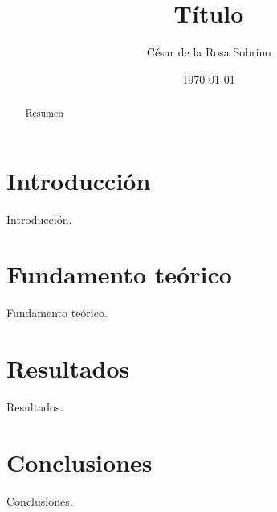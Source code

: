 \documentclass[twocolumn, aps, prd, 10pt, nofootinbib]{revtex4-2}
\date{\today}
\makeatletter
\renewcommand{\date}[1]{\gdef\@date{\textnormal{Fecha: #1}}}
\makeatother
\begin{document}
\title{Título}
\author{César de la Rosa Sobrino}
\date{\today}

\begin{abstract}
	Resumen
\end{abstract}

\maketitle

\section{Introducción}
Introducción.
\section{Fundamento teórico}
Fundamento teórico.
\section{Resultados}
Resultados.
\section{Conclusiones}
Conclusiones.



\end{document}
